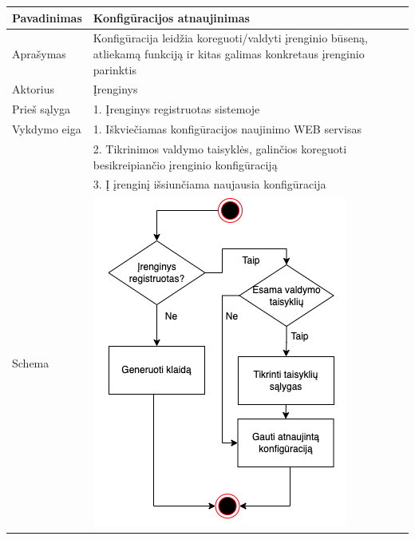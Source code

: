 \documentclass{VUMIFInfBakalaurinis}
\begin{document}
%
%
\begin{tabular}{  l  p{10cm}  p{15cm} }

\toprule
\textbf{Pavadinimas}
& \textbf{Konfigūracijos atnaujinimas} \\
\midrule

Aprašymas
& Konfigūracija leidžia koreguoti/valdyti įrenginio būseną, atliekamą funkciją ir kitas galimas konkretaus įrenginio parinktis \\

\hline
Aktorius    
& Įrenginys \\

\hline
Prieš sąlyga
& 1. Įrenginys registruotas sistemoje \\

\hline
Vykdymo eiga
& 1. Iškviečiamas konfigūracijos naujinimo WEB servisas \\
& 2. Tikrinimos valdymo taisyklės, galinčios koreguoti besikreipiančio įrenginio konfigūraciją \\
& 3. Į įrenginį išsiunčiama naujausia konfigūracija \\

\hline
Schema
&
\begin{minipage}{.5\textwidth}
  \includegraphics[scale=0.6]{img/flowchart-config}
\end{minipage} \\

\bottomrule
\end{tabular}
\end{document}
